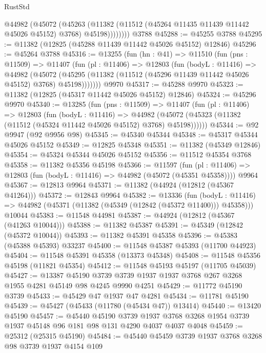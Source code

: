 \begin{lexlean}{RustStd}
\begin{coremodule}
            @44982
              (@45072
                (@45263
                  (@11382 (@11512 (@45264 @11435 @11439 @11442 @45026 @45152) @3768) @45198))))))))
    @3788
@45288 := @45255 @3788
@45295 := @11382 (@12825 (@45288 @11439 @11442 @45026 @45152) @12846)
@45296 := @45264 @3788
@45316 := @13255
    (fun (hn : @41) =>
    @11510
      (fun (pns : @11509) =>
      @11407
        (fun (pl : @11406) =>
        @12803
          (fun (bodyL : @11416) =>
          @44982
            (@45072
              (@45295 (@11382 (@11512 (@45296 @11439 @11442 @45026 @45152) @3768) @45198)))))))
    @9970
@45317 := @45288 @9970
@45323 := @11382 (@12825 (@45317 @11442 @45026 @45152) @12846)
@45324 := @45296 @9970
@45340 := @13285
    (fun (pns : @11509) =>
    @11407
      (fun (pl : @11406) =>
      @12803
        (fun (bodyL : @11416) =>
        @44982 (@45072 (@45323 (@11382 (@11512 (@45324 @11442 @45026 @45152) @3768) @45198))))))
@45344 := @92 @9947 (@92 @9956 @98)
@45345 := @45340 @45344
@45348 := @45317 @45344 @45026 @45152
@45349 := @12825 @45348
@45351 := @11382 (@45349 @12846)
@45354 := @45324 @45344 @45026 @45152
@45356 := @11512 @45354 @3768
@45358 := @11382 @45356 @45198
@45366 := @11597
    (fun (pl : @11406) => @12803 (fun (bodyL : @11416) => @44982 (@45072 (@45351 @45358))))
    @9964
@45367 := @12813 @9964
@45371 := @11382 (@44924 (@12812 (@45367 @41264)))
@45372 := @12843 @9964
@45382 := @13336
    (fun (bodyL : @11416) => @44982 (@45371 (@11382 (@45349 (@12842 (@45372 @11400))) @45358)))
    @10044
@45383 := @11548 @44981
@45387 := @44924 (@12812 (@45367 (@41263 @10044)))
@45388 := @11382 @45387
@45391 := @45349 (@12842 (@45372 @10044))
@45393 := @11382 @45391 @45358
@45396 := @45383 (@45388 @45393) @33237
@45400 := @11548 @45387 @45393 (@11700 @44923)
@45404 := @11548 @45391 @45358 (@13373 @45348)
@45408 := @11548 @45356 @45198 (@11821 @45354)
@45412 := @11548 @45193 @45197 (@11705 @45039)
@45427 := @13387
    @45190
    @3739
    @3739
    @1937
    @1937
    @3768
    @267
    @3268
    @1955
    @4281
    @45149
    @98
    @4245
    @9990
    @4251
@45429 := @11772 @45190 @3739
@45433 := @45429 @47 @1937 @47 @4281
@45434 := @11781 @45190
@45439 := @45427 (@45433 (@11780 (@45434 @47)) @13414)
@45440 := @13420 @45190
@45457 := @45440
    @45190
    @3739
    @1937
    @3768
    @3268
    @1954
    @3739
    @1937
    @45148
    @96
    @181
    @98
    @131
    @4290
    @4037
    @4037
    @4048
@45459 := @25312 (@25315 @45190)
@45484 := @45440
    @45459
    @3739
    @1937
    @3768
    @3268
    @98
    @3739
    @1937
    @4154
    @109

\end{coremodule}
\end{lexlean}
